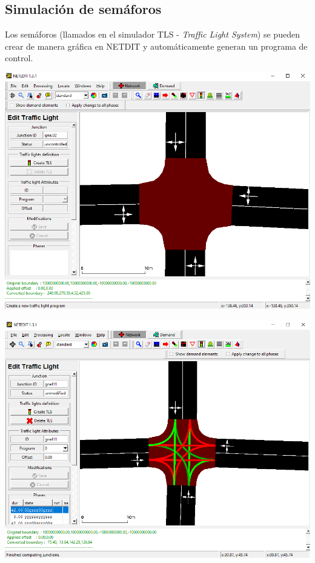\hypertarget{simulaciuxf3n-de-semuxe1foros}{%
\subsection{Simulación de
semáforos}\label{simulaciuxf3n-de-semuxe1foros}}

Los semáforos (llamados en el simulador TLS - \emph{Traffic Light
System}) se pueden crear de manera gráfica en NETDIT y automáticamente
generan un programa de control.

\includegraphics[width=\textwidth]{sumo/d53e12f08f94d08fd7e31f214786b43e.png}

\includegraphics[width=\textwidth]{sumo/e760085ba60c72e71c15ed1d0d5ab9aa.png}

